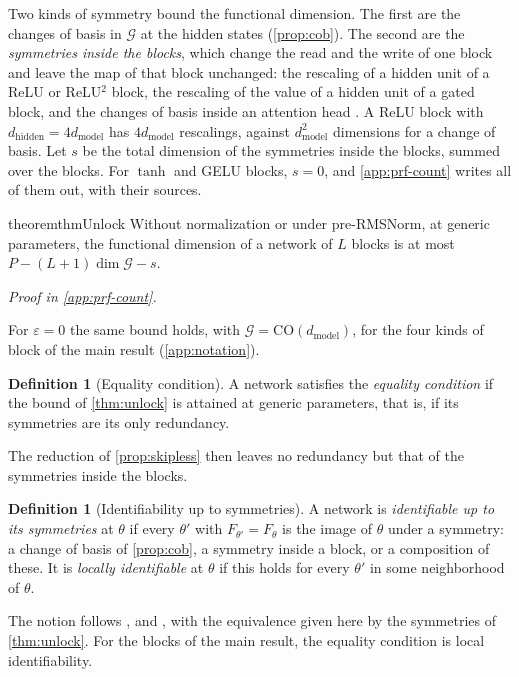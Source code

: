 \documentclass[10pt]{article}
\theoremstyle{definition}
\newtheorem{definition}[theorem]{Definition}
\theoremstyle{remark}
\newcommand{\dm}{d_{\mathrm{model}}}
\newcommand{\dhid}{d_{\mathrm{hidden}}}
\newcommand{\CO}{\mathrm{CO}}
\newcommand{\G}{\mathcal{G}}
\newcommand{\proofin}[1]{\par\vspace{-0.4\baselineskip}\noindent\hfill{\small\itshape Proof in \cref{#1}.}\par\smallskip}
\begin{document}
Two kinds of symmetry bound the functional dimension. The first are the changes of basis in $\G$ at the hidden states (\cref{prop:cob}). The second are the \emph{symmetries inside the blocks}, which change the read and the write of one block and leave the map of that block unchanged: the rescaling of a hidden unit of a ReLU or ReLU$^2$ block, the rescaling of the value of a hidden unit of a gated block, and the changes of basis inside an attention head \citep{rolnick2020reverse,godfrey2022symmetries,elhage2021circuits,tran2025equivariant,vannierop2024gauge}. A ReLU block with $\dhid = 4\dm$ has $4\dm$ rescalings, against $\dm^2$ dimensions for a change of basis. Let $s$ be the total dimension of the symmetries inside the blocks, summed over the blocks. For $\tanh$ and GELU blocks, $s = 0$, and \cref{app:prf-count} writes all of them out, with their sources.

\begin{restatable}{theorem}{thmUnlock}\label{thm:unlock}
Without normalization or under pre-RMSNorm, at generic parameters, the functional dimension of a network of $L$ blocks is at most $P - (L+1)\dim\G - s$.
\end{restatable}
\proofin{app:prf-count}

For $\varepsilon = 0$ the same bound holds, with $\G = \CO(\dm)$, for the four kinds of block of the main result (\cref{app:notation}).

\begin{definition}[Equality condition]\label{def:equality}
A network satisfies the \emph{equality condition} if the bound of \cref{thm:unlock} is attained at generic parameters, that is, if its symmetries are its only redundancy.
\end{definition}

The reduction of \cref{prop:skipless} then leaves no redundancy but that of the symmetries inside the blocks.

\begin{definition}[Identifiability up to symmetries]\label{def:ident}
A network is \emph{identifiable up to its symmetries} at $\theta$ if every $\theta'$ with $F_{\theta'} = F_\theta$ is the image of $\theta$ under a symmetry: a change of basis of \cref{prop:cob}, a symmetry inside a block, or a composition of these. It is \emph{locally identifiable} at $\theta$ if this holds for every $\theta'$ in some neighborhood of $\theta$.
\end{definition}

The notion follows \citet{vlacic2019identifiability,vlacic2020affine}, \citet{stock2021embedding} and \citet{bonapellissier2022local}, with the equivalence given here by the symmetries of \cref{thm:unlock}. For the blocks of the main result, the equality condition is local identifiability.
\end{document}
